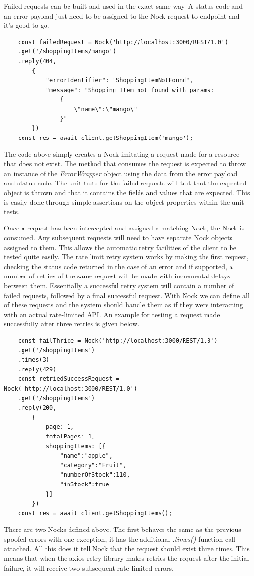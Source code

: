 Failed requests can be built and used in the exact same way. A status code and an error payload just need to be assigned to the Nock request to endpoint and it's good to go.
\begin{verbatim}
    const failedRequest = Nock('http://localhost:3000/REST/1.0')
    .get('/shoppingItems/mango')
    .reply(404, 
        {
            "errorIdentifier": "ShoppingItemNotFound",
            "message": "Shopping Item not found with params: 
                {
                    \"name\":\"mango\"
                }"
        })
    const res = await client.getShoppingItem('mango');
\end{verbatim}
The code above simply creates a Nock imitating a request made for a resource that does not exist. The method that consumes the request is expected to throw an instance of the \textit{ErrorWrapper} object using the data from the error payload and status code. The unit tests for the failed requests will test that the expected object is thrown and that it contains the fields and values that are expected. This is easily done through simple assertions on the object properties within the unit tests.

Once a request has been intercepted and assigned a matching Nock, the Nock is consumed. Any subsequent requests will need to have separate Nock objects assigned to them. This allows the automatic retry facilities of the client to be tested quite easily. The rate limit retry system works by making the first request, checking the status code returned in the case of an error and if supported, a number of retries of the same request will be made with incremental delays between them. Essentially a successful retry system will contain a number of failed requests, followed by a final successful request. With Nock we can define all of these requests and the system should handle them as if they were interacting with an actual rate-limited API. An example for testing a request made successfully after three retries is given below.
\begin{verbatim}
    const failThrice = Nock('http://localhost:3000/REST/1.0')
    .get('/shoppingItems')
    .times(3)
    .reply(429)
    const retriedSuccessRequest = Nock('http://localhost:3000/REST/1.0')
    .get('/shoppingItems') 
    .reply(200,
        {
            page: 1,
            totalPages: 1,
            shoppingItems: [{
                "name":"apple",
                "category":"Fruit",
                "numberOfStock":110,
                "inStock":true
            }]
        })
    const res = await client.getShoppingItems();
\end{verbatim}
There are two Nocks defined above. The first behaves the same as the previous spoofed errors with one exception, it has the additional \textit{.times()} function call attached. All this does it tell Nock that the request should exist three times. This means that when the axios-retry library makes retries the request after the initial failure, it will receive two subsequent rate-limited errors. 

